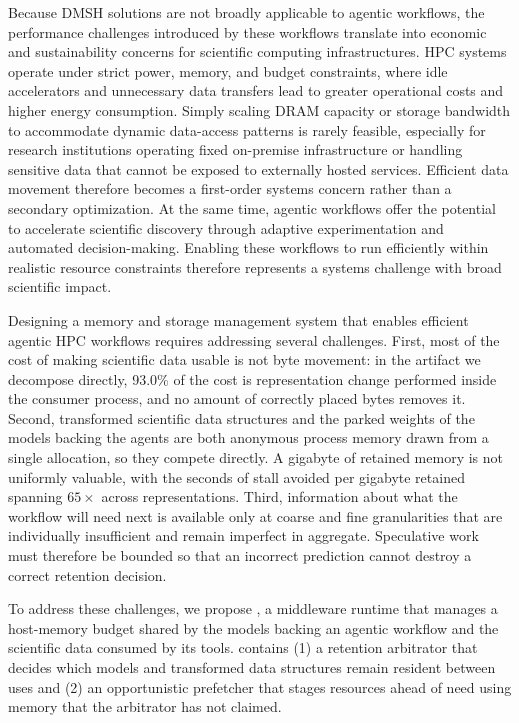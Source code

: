 Because DMSH solutions are not broadly applicable to agentic workflows, the
performance challenges introduced by these workflows translate into economic
and sustainability concerns for scientific computing infrastructures. HPC
systems operate under strict power, memory, and budget constraints, where idle
accelerators and unnecessary data transfers lead to greater operational costs
and higher energy consumption. Simply scaling DRAM capacity or storage
bandwidth to accommodate dynamic data-access patterns is rarely feasible,
especially for research institutions operating fixed on-premise infrastructure
or handling sensitive data that cannot be exposed to externally hosted
services. Efficient data movement therefore becomes a first-order systems
concern rather than a secondary optimization. At the same time, agentic
workflows offer the potential to accelerate scientific discovery through
adaptive experimentation and automated decision-making. Enabling these
workflows to run efficiently within realistic resource constraints therefore
represents a systems challenge with broad scientific impact.

Designing a memory and storage management system that enables efficient
agentic HPC workflows requires addressing several challenges. First, most of
the cost of making scientific data usable is not byte movement: in the
artifact we decompose directly, 93.0\% of the cost is representation change
performed inside the consumer process, and no amount of correctly placed bytes
removes it. Second, transformed scientific data structures and the parked
weights of the models backing the agents are both anonymous process memory
drawn from a single allocation, so they compete directly. A gigabyte of
retained memory is not uniformly valuable, with the seconds of stall avoided
per gigabyte retained spanning $65\times$ across representations. Third,
information about what the workflow will need next is available only at coarse
and fine granularities that are individually insufficient and remain imperfect
in aggregate. Speculative work must therefore be bounded so that an incorrect
prediction cannot destroy a correct retention decision.

To address these challenges, we propose \sysname, a middleware runtime that
manages a host-memory budget shared by the models backing an agentic workflow
and the scientific data consumed by its tools. \sysname contains (1) a
retention arbitrator that decides which models and transformed data structures
remain resident between uses and (2) an opportunistic prefetcher that stages
resources ahead of need using memory that the arbitrator has not claimed.


